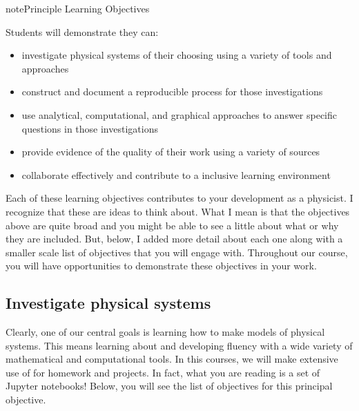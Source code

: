 \documentclass[letterpaper,10pt,english]{jupyterBook}
\begin{document}
\begin{sphinxadmonition}{note}{Principle Learning Objectives}

\sphinxAtStartPar
Students will demonstrate they can:
\begin{itemize}
\item {} 
\sphinxAtStartPar
investigate physical systems of their choosing using a variety of tools and approaches

\item {} 
\sphinxAtStartPar
construct and document a reproducible process for those investigations

\item {} 
\sphinxAtStartPar
use analytical, computational, and graphical approaches to answer specific questions in those investigations

\item {} 
\sphinxAtStartPar
provide evidence of the quality of their work using a variety of sources

\item {} 
\sphinxAtStartPar
collaborate effectively and contribute to a inclusive learning environment

\end{itemize}
\end{sphinxadmonition}

\sphinxAtStartPar
Each of these learning objectives contributes to your development as a physicist. I recognize that these are  ideas to think about. What I mean is that the objectives above are quite broad and you might be able to see a little about what or why they are included. But, below, I added more detail about each one along with a smaller scale list of objectives that you will engage with. Throughout our course, you will have opportunities to demonstrate these objectives in your work. 


\subsection{Investigate physical systems}
\label{\detokenize{content/0_course/1_goals:investigate-physical-systems}}
\sphinxAtStartPar
Clearly, one of our central goals is learning how to make models of physical systems. This means learning about and developing fluency with a wide variety of mathematical and computational tools. In this courses, we will make extensive use of  for homework and projects. In fact, what you are reading is a set of Jupyter notebooks! Below, you will see the list of objectives for this principal objective.
\end{document}

